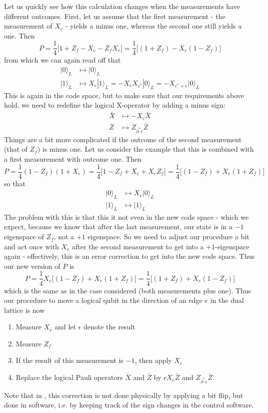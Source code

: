 \documentclass[a4paper, draft]{article}
\theoremstyle{own}
\theoremstyle{remark}
\begin{document}
Let us quickly see how this calculation changes when the measurements have different outcomes. First, let us assume that the first measurement - the measurement of $X_e$ - yields a minus one, whereas the second one still yields a one. Then 
$$
P = \frac{1}{4} \big[ 1 + Z_f - X_e - Z_f X_e \big]
= \frac{1}{4} \big[ (1 + Z_f) - X_e (1 -   Z_f) \big]
$$
from which we can again read off that
\begin{align*}
|0 \rangle_L &\mapsto |0 \rangle_L \\
|1 \rangle_L &\mapsto X_e |1 \rangle_L = - X_e X_{c^*} |0 \rangle_L = - X_{c^* + e} |0 \rangle_L
\end{align*}
This is again in the code space, but to make sure that our requirements above hold, we need to redefine the logical X-operator by adding a minus sign:
\begin{align*}
\bar{X} &\mapsto  - X_e \bar{X} \\
\bar{Z} &\mapsto Z_{\partial^* e} \bar{Z}
\end{align*}
Things are a bit more complicated if the outcome of the second measurement (that of $Z_f$) is minus one. Let us consider the example that this is combined with a first measurement with outcome one. Then
$$
P = \frac{1}{4} (1 - Z_f)(1 + X_e) = \frac{1}{4} \big[ 1 - Z_f + X_e +  X_e Z_f \big]
= \frac{1}{4} \big[ (1 - Z_f) + X_e (1 + Z_f) \big]
$$
so that
\begin{align*}
|0 \rangle_L &\mapsto X_e |0 \rangle_L \\
|1 \rangle_L &\mapsto |1  \rangle_L
\end{align*}
The problem with this is that this it not even in the new code space - which we expect, because we know that after the last measurement, our state is in a $-1$ eigenspace of $Z_f$, not a $+1$ eigenspace. So we need to adjust our procedure a bit and act once with $X_e$ after the second measurement to get into a $+1$-eigenspace again - effectively, this is an error correction to get into the new code space. Thus our new version of $P$ is
$$
P = \frac{1}{4} X_e \big[ (1 - Z_f) + X_e (1 + Z_f) \big]
= \frac{1}{4}  \big[ (1 + Z_f) +  X_e (1 - Z_f) \big]
$$
which is the same as in the case considered (both measurements plus one). Thus our procedure to move a logical qubit in the direction of an edge $e$ in the dual lattice is now
\begin{enumerate}
	\item Measure $X_e$ and let $\epsilon$ denote the result
	\item Measure $Z_f$
	\item If the result of this measurement is $-1$, then apply $X_e$
	\item Replace the logical Pauli operators $\bar{X}$ and $\bar{Z}$ by $\epsilon X_e \bar{Z}$ and $Z_{\partial^*e} \bar{Z}$. 
\end{enumerate}
Note that in \cite{SurfaceCodes}, this correction is not done physically by applying a bit flip, but done in software, i.e. by keeping track of the sign changes in the control software. 
\end{document}
